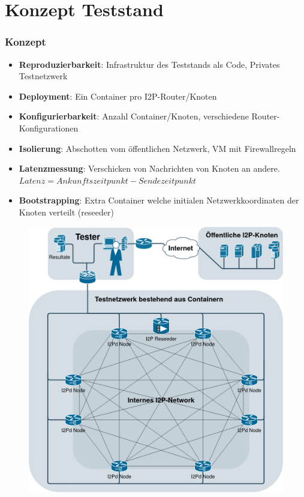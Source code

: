 \documentclass{beamer}
\begin{document}
\section{Konzept Teststand}

    \begin{frame}[allowframebreaks]
        \frametitle{Konzept}

        \begin{itemize}
            \item \textbf{Reproduzierbarkeit}: Infrastruktur des Teststands als Code, Privates Testnetzwerk
            \item \textbf{Deployment}: Ein Container pro I2P-Router/Knoten
            \item \textbf{Konfigurierbarkeit}: Anzahl Container/Knoten, verschiedene Router-Konfigurationen
            \item \textbf{Isolierung}: Abschotten vom öffentlichen Netzwerk, VM mit Firewallregeln
            \item \textbf{Latenzmessung}: Verschicken von Nachrichten von Knoten an andere. $Latenz = Ankunftszeitpunkt - Sendezeitpunkt$
            \item \textbf{Bootstrapping}: Extra Container welche initialen Netzwerkkoordinaten der Knoten verteilt (reseeder)
        \end{itemize}

        \begin{figure}[ht]
          \includegraphics[height=0.8\textheight]{img/i2p-testnetwork.png}
        \end{figure}
    \end{frame}
\end{document}
